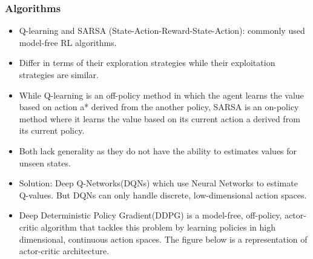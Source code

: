 \begin{frame}[fragile]\frametitle{Algorithms}

\begin{itemize}
\item Q-learning and SARSA (State-Action-Reward-State-Action): commonly used model-free RL algorithms. 
\item Differ in terms of their exploration strategies while their exploitation strategies are similar. 
\item While Q-learning is an off-policy method in which the agent learns the value based on action a* derived from the another policy, SARSA is an on-policy method where it learns the value based on its current action a derived from its current policy.
\item Both lack generality as they do not have the ability to estimates values for unseen states.
\item Solution:  Deep Q-Networks(DQNs) which use Neural Networks to estimate Q-values. But DQNs can only handle discrete, low-dimensional action spaces.
\item Deep Deterministic Policy Gradient(DDPG) is a model-free, off-policy, actor-critic algorithm that tackles this problem by learning policies in high dimensional, continuous action spaces. The figure below is a representation of actor-critic architecture.
\end{itemize}




\end{frame}

